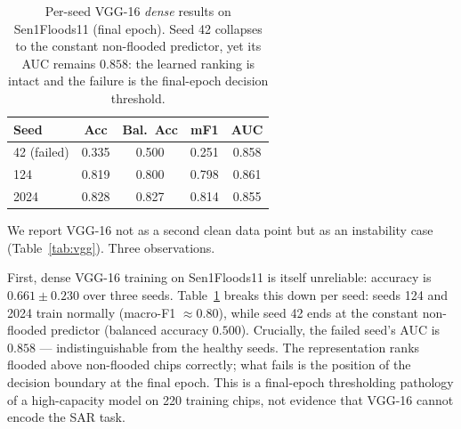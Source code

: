 \documentclass[conference]{IEEEtran}
\newif\ifreview
\newcommand{\REV}[1]{\ifreview\textcolor{red}{\textbf{[Revise: #1]}}\fi}
\begin{document}
\begin{table}[t]
\centering
\caption{Per-seed VGG-16 \emph{dense} results on Sen1Floods11
(final epoch). Seed 42 collapses to the constant non-flooded
predictor, yet its AUC remains $0.858$: the learned ranking is intact
and the failure is the final-epoch decision threshold.}
\label{tab:vggperseed}
\footnotesize
\begin{tabular}{lcccc}
\toprule
\textbf{Seed} & \textbf{Acc} & \textbf{Bal.\ Acc} & \textbf{mF1} &
\textbf{AUC}\\
\midrule
42 (failed) & 0.335 & 0.500 & 0.251 & 0.858\\
124         & 0.819 & 0.800 & 0.798 & 0.861\\
2024        & 0.828 & 0.827 & 0.814 & 0.855\\
\bottomrule
\end{tabular}
\end{table}
\REV{[A10] Space: this table has 3 rows; fold it into one sentence in
the text if you need room for the new figures. [B8] The claim ``the
failure is the decision threshold'' is currently inferred from AUC. Prove
it cheaply: for seed 42, pick the threshold on the \emph{training} set
(e.g., Youden index) and report validation mF1/BAcc; if it recovers
to $\approx0.8$, state it. (Needs saved logits; if not saved, re-run
this one model.)}

We report VGG-16 not as a second clean data point but as an
instability case (Table~\ref{tab:vgg}). Three observations.

First, dense VGG-16 training on Sen1Floods11 is itself unreliable:
accuracy is $0.661\pm0.230$ over three seeds.
Table~\ref{tab:vggperseed} breaks this down per seed: seeds 124 and
2024 train normally (macro-F1 $\approx 0.80$), while seed 42 ends at
the constant non-flooded predictor (balanced accuracy $0.500$).
Crucially, the failed seed's AUC is $0.858$ --- indistinguishable from
the healthy seeds. The representation ranks flooded above non-flooded
chips correctly; what fails is the position of the decision boundary
at the final epoch. This is a final-epoch thresholding pathology of a
high-capacity model on 220 training chips, not evidence that VGG-16
cannot encode the SAR task.
\end{document}
